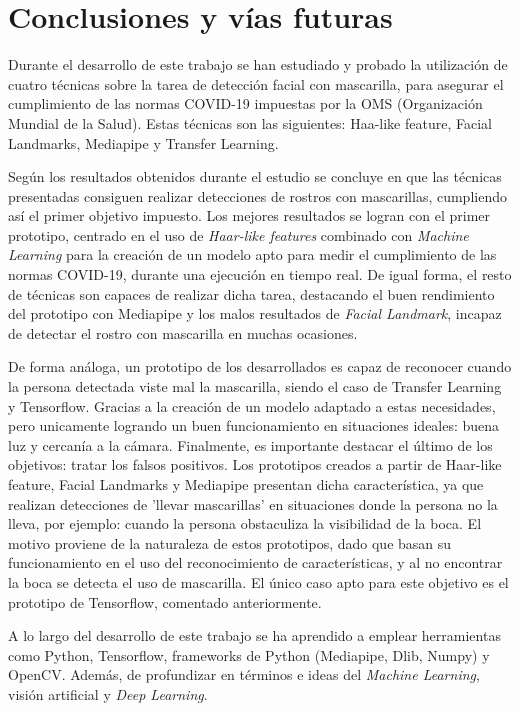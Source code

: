 
\chapter{Conclusiones y vías futuras}

Durante el desarrollo de este trabajo se han estudiado y probado la utilización de cuatro técnicas sobre la tarea de detección facial con mascarilla, para asegurar el cumplimiento de las normas COVID-19 impuestas por la OMS (Organización Mundial de la Salud). Estas técnicas son las siguientes: Haa-like feature, Facial Landmarks, Mediapipe y Transfer Learning.

Según los resultados obtenidos durante el estudio se concluye en que las técnicas presentadas consiguen realizar detecciones de rostros con mascarillas, cumpliendo así el primer objetivo impuesto. Los mejores resultados se logran con el primer prototipo, centrado en el uso de \textit{Haar-like features} combinado con \textit{Machine Learning} para la creación de un modelo apto para medir el cumplimiento de las normas COVID-19, durante una ejecución en tiempo real. De igual forma, el resto de técnicas son capaces de realizar dicha tarea, destacando el buen rendimiento del prototipo con Mediapipe y los malos resultados de \textit{Facial Landmark}, incapaz de detectar el rostro con mascarilla en muchas ocasiones.

De forma análoga, un prototipo de los desarrollados es capaz de reconocer cuando la persona detectada viste mal la mascarilla, siendo el caso de Transfer Learning y Tensorflow. Gracias a la creación de un modelo adaptado a estas necesidades, pero unicamente logrando un buen funcionamiento en situaciones ideales: buena luz y cercanía a la cámara. Finalmente, es importante destacar el último de los objetivos: tratar los falsos positivos. Los prototipos creados a partir de Haar-like feature, Facial Landmarks y Mediapipe presentan dicha característica, ya que realizan detecciones de 'llevar mascarillas' en situaciones donde la persona no la lleva, por ejemplo: cuando la persona obstaculiza la visibilidad de la boca. El motivo proviene de la naturaleza de estos prototipos, dado que basan su funcionamiento en el uso del reconocimiento de características, y al no encontrar la boca se detecta el uso de mascarilla. El único caso apto para este objetivo es el prototipo de Tensorflow, comentado anteriormente.

A lo largo del desarrollo de este trabajo se ha aprendido a emplear herramientas como Python, Tensorflow, frameworks de Python (Mediapipe, Dlib, Numpy) y OpenCV. Además, de profundizar en términos e ideas del \textit{Machine Learning}, visión artificial y \textit{Deep Learning}.

